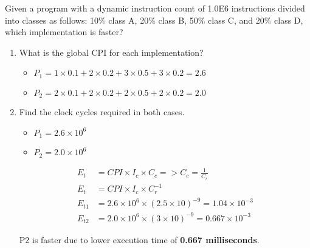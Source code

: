 \documentclass[10pt]{article}
\begin{document}
\begin{enumerate}
    Given a program with a dynamic instruction count of 1.0E6 instructions divided into classes as follows: 10\% class A, 20\% class B, 50\% class C, and 20\% class D, which implementation is faster?
    \begin{enumerate}
        \item What is the global CPI for each implementation?
        \begin{itemize}
            \item $P_1 = 1\times0.1+2\times0.2+3\times0.5+3\times0.2=2.6$
            \item $P_2 = 2\times0.1+2\times0.2+2\times0.5+2\times0.2=2.0$
        \end{itemize}
        \item Find the clock cycles required in both cases.
        \begin{itemize}
            \item $P_1 = 2.6\times10^6$
            \item $P_2 = 2.0\times10^6$
        \end{itemize}
        \begin{align*}
            E_{t} &= CPI \times I_c \times C_c => C_c = \frac{1}{C_r}\\
            E_{t} &= CPI \times I_c \times C_r^{-1}\\
            E_{t1} &= 2.6 \times 10^6\times (2.5\times10)^{-9} = 1.04 \times 10^{-3}\\
            E_{t2} &= 2.0 \times 10^6\times (3 \times 10)^{-9} = 0.667 \times 10^{-3}
        \end{align*}
        \begin{center}
            P2 is faster due to lower execution time of \textbf{0.667 milliseconds}.
        \end{center}
    \end{enumerate}
    

\end{enumerate}
\end{document}
